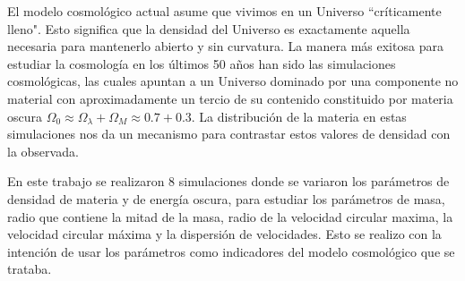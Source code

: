 
El modelo cosmológico actual asume que vivimos en un Universo ``críticamente lleno". Esto significa que la densidad  del Universo es exactamente aquella necesaria para mantenerlo abierto y sin curvatura. La manera más exitosa para estudiar la cosmología en los últimos 50 años han sido las simulaciones cosmológicas, las cuales apuntan a un Universo dominado por una componente no material con aproximadamente un tercio de su contenido constituido por materia oscura $\Omega_0 \approx \Omega_\lambda + \Omega_M \approx 0.7+ 0.3$. La distribución de la materia en estas simulaciones nos da un mecanismo para contrastar estos valores de densidad con la observada.


 { \blues En este trabajo se realizaron 8 simulaciones donde se variaron los parámetros de densidad de materia y de energía oscura, para estudiar los parámetros de masa, radio que contiene la mitad de la masa, radio de la velocidad circular maxima, la velocidad circular máxima y la dispersión de velocidades. Esto se realizo con la intención de usar los parámetros como indicadores del modelo cosmológico que se trataba.}




